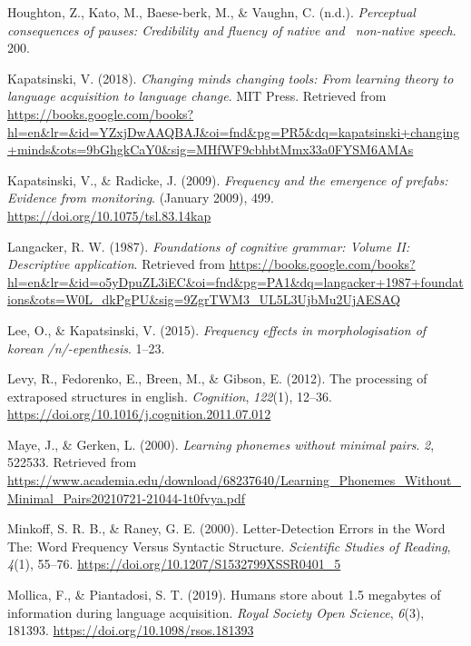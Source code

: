 \documentclass[
  man,floatsintext]{apa6}
\newlength{\cslhangindent}
\newlength{\cslentryspacingunit} %
\newenvironment{CSLReferences}[2] %
 {%
  \setlength{\parindent}{0pt}
  \ifodd #1
  \let\oldpar\par
  \def\par{\hangindent=\cslhangindent\oldpar}
  \fi
  \setlength{\parskip}{#2\cslentryspacingunit}
 }%
 {}
\begin{document}
\begin{CSLReferences}{1}{0}
\leavevmode{}%
Houghton, Z., Kato, M., Baese-berk, M., \& Vaughn, C. (n.d.). \emph{Perceptual consequences of pauses: Credibility and fluency of native and~ non-native speech}. 200.

\leavevmode{}%
Kapatsinski, V. (2018). \emph{Changing minds changing tools: From learning theory to language acquisition to language change}. MIT Press. Retrieved from \url{https://books.google.com/books?hl=en\&lr=\&id=YZxjDwAAQBAJ\&oi=fnd\&pg=PR5\&dq=kapatsinski+changing+minds\&ots=9bGhgkCaY0\&sig=MHfWF9cbhbtMmx33a0FYSM6AMAs}

\leavevmode{}%
Kapatsinski, V., \& Radicke, J. (2009). \emph{Frequency and the emergence of prefabs: Evidence from monitoring}. (January 2009), 499. \url{https://doi.org/10.1075/tsl.83.14kap}

\leavevmode{}%
Langacker, R. W. (1987). \emph{Foundations of cognitive grammar: Volume II: Descriptive application}. Retrieved from \url{https://books.google.com/books?hl=en\&lr=\&id=o5yDpuZL3iEC\&oi=fnd\&pg=PA1\&dq=langacker+1987+foundations\&ots=W0L_dkPgPU\&sig=9ZgrTWM3_UL5L3UjbMu2UjAESAQ}

\leavevmode{}%
Lee, O., \& Kapatsinski, V. (2015). \emph{Frequency effects in morphologisation of korean /n/-epenthesis}. 1--23.

\leavevmode{}%
Levy, R., Fedorenko, E., Breen, M., \& Gibson, E. (2012). The processing of extraposed structures in english. \emph{Cognition}, \emph{122}(1), 12--36. \url{https://doi.org/10.1016/j.cognition.2011.07.012}

\leavevmode{}%
Maye, J., \& Gerken, L. (2000). \emph{Learning phonemes without minimal pairs}. \emph{2}, 522533. Retrieved from \url{https://www.academia.edu/download/68237640/Learning_Phonemes_Without_Minimal_Pairs20210721-21044-1t0fvya.pdf}

\leavevmode{}%
Minkoff, S. R. B., \& Raney, G. E. (2000). Letter-Detection Errors in the Word The: Word Frequency Versus Syntactic Structure. \emph{Scientific Studies of Reading}, \emph{4}(1), 55--76. \url{https://doi.org/10.1207/S1532799XSSR0401_5}

\leavevmode{}%
Mollica, F., \& Piantadosi, S. T. (2019). Humans store about 1.5 megabytes of information during language acquisition. \emph{Royal Society Open Science}, \emph{6}(3), 181393. \url{https://doi.org/10.1098/rsos.181393}


\end{CSLReferences}
\end{document}
